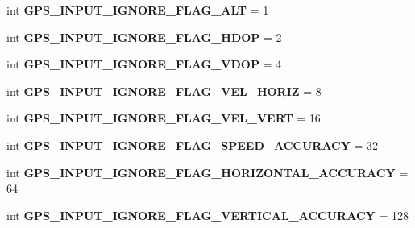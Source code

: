 \begin{DoxyCompactItemize}
int {\bfseries G\+P\+S\+\_\+\+I\+N\+P\+U\+T\+\_\+\+I\+G\+N\+O\+R\+E\+\_\+\+F\+L\+A\+G\+\_\+\+A\+LT} = 1
\item 
\mbox{\label{namespacepymavlink_1_1dialects_1_1v10_a534431eda402a1c79c82e947d9632e2b}} 
int {\bfseries G\+P\+S\+\_\+\+I\+N\+P\+U\+T\+\_\+\+I\+G\+N\+O\+R\+E\+\_\+\+F\+L\+A\+G\+\_\+\+H\+D\+OP} = 2
\item 
\mbox{\label{namespacepymavlink_1_1dialects_1_1v10_a081cd6e800087dfb6c5552f6681738f9}} 
int {\bfseries G\+P\+S\+\_\+\+I\+N\+P\+U\+T\+\_\+\+I\+G\+N\+O\+R\+E\+\_\+\+F\+L\+A\+G\+\_\+\+V\+D\+OP} = 4
\item 
\mbox{\label{namespacepymavlink_1_1dialects_1_1v10_a187b0f960f8c2117bed55551e772c2ad}} 
int {\bfseries G\+P\+S\+\_\+\+I\+N\+P\+U\+T\+\_\+\+I\+G\+N\+O\+R\+E\+\_\+\+F\+L\+A\+G\+\_\+\+V\+E\+L\+\_\+\+H\+O\+R\+IZ} = 8
\item 
\mbox{\label{namespacepymavlink_1_1dialects_1_1v10_a607ee64fea592cd2e48f13ff612b7355}} 
int {\bfseries G\+P\+S\+\_\+\+I\+N\+P\+U\+T\+\_\+\+I\+G\+N\+O\+R\+E\+\_\+\+F\+L\+A\+G\+\_\+\+V\+E\+L\+\_\+\+V\+E\+RT} = 16
\item 
\mbox{\label{namespacepymavlink_1_1dialects_1_1v10_a42deee5af268a5806510105f53068a40}} 
int {\bfseries G\+P\+S\+\_\+\+I\+N\+P\+U\+T\+\_\+\+I\+G\+N\+O\+R\+E\+\_\+\+F\+L\+A\+G\+\_\+\+S\+P\+E\+E\+D\+\_\+\+A\+C\+C\+U\+R\+A\+CY} = 32
\item 
\mbox{\label{namespacepymavlink_1_1dialects_1_1v10_ae5e7c5c59bb9a2bb9fb150c39d8059a3}} 
int {\bfseries G\+P\+S\+\_\+\+I\+N\+P\+U\+T\+\_\+\+I\+G\+N\+O\+R\+E\+\_\+\+F\+L\+A\+G\+\_\+\+H\+O\+R\+I\+Z\+O\+N\+T\+A\+L\+\_\+\+A\+C\+C\+U\+R\+A\+CY} = 64
\item 
\mbox{\label{namespacepymavlink_1_1dialects_1_1v10_a89c6a3fe1d7086efc8c1e754f25b03d9}} 
int {\bfseries G\+P\+S\+\_\+\+I\+N\+P\+U\+T\+\_\+\+I\+G\+N\+O\+R\+E\+\_\+\+F\+L\+A\+G\+\_\+\+V\+E\+R\+T\+I\+C\+A\+L\+\_\+\+A\+C\+C\+U\+R\+A\+CY} = 128
\item 

\end{DoxyCompactItemize}
